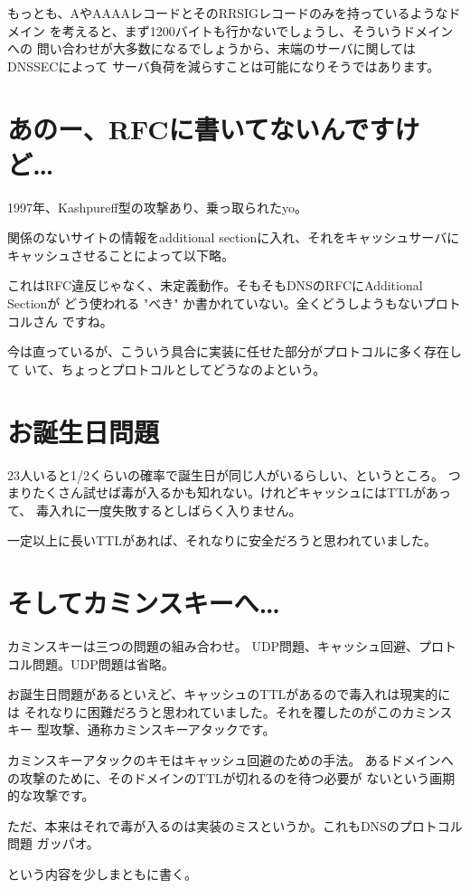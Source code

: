 もっとも、AやAAAAレコードとそのRRSIGレコードのみを持っているようなドメイン
を考えると、まず1200バイトも行かないでしょうし、そういうドメインへの
問い合わせが大多数になるでしょうから、末端のサーバに関してはDNSSECによって
サーバ負荷を減らすことは可能になりそうではあります。

\section{あのー、RFCに書いてないんですけど…}
1997年、Kashpureff型の攻撃あり、乗っ取られたyo。

関係のないサイトの情報をadditional sectionに入れ、それをキャッシュサーバに
キャッシュさせることによって以下略。

これはRFC違反じゃなく、未定義動作。そもそもDNSのRFCにAdditional Sectionが
どう使われる "べき" か書かれていない。全くどうしようもないプロトコルさん
ですね。

今は直っているが、こういう具合に実装に任せた部分がプロトコルに多く存在して
いて、ちょっとプロトコルとしてどうなのよという。

\section{お誕生日問題}
23人いると1/2くらいの確率で誕生日が同じ人がいるらしい、というところ。
つまりたくさん試せば毒が入るかも知れない。けれどキャッシュにはTTLがあって、
毒入れに一度失敗するとしばらく入りません。

一定以上に長いTTLがあれば、それなりに安全だろうと思われていました。


\section{そしてカミンスキーへ…}
カミンスキーは三つの問題の組み合わせ。
UDP問題、キャッシュ回避、プロトコル問題。UDP問題は省略。

お誕生日問題があるといえど、キャッシュのTTLがあるので毒入れは現実的には
それなりに困難だろうと思われていました。それを覆したのがこのカミンスキー
型攻撃、通称カミンスキーアタックです。%

カミンスキーアタックのキモはキャッシュ回避のための手法。
あるドメインへの攻撃のために、そのドメインのTTLが切れるのを待つ必要が
ないという画期的な攻撃です。

ただ、本来はそれで毒が入るのは実装のミスというか。これもDNSのプロトコル問題
ガッパオ。

という内容を少しまともに書く。
